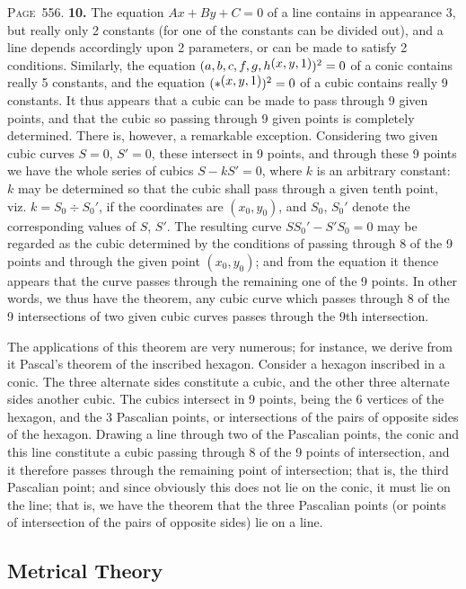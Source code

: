 \documentclass[11pt,a4paper]{article}
\theoremstyle{definition}
\begin{document}
\newpage
\noindent\textsc{Page~556.} \textbf{10.} The equation $Ax+By+C=0$ of a line contains in appearance 3, but really only 2 constants (for one of the constants can be divided out), and a line depends accordingly upon 2 parameters, or can be made to satisfy 2 conditions. Similarly, the equation $(a,b,c,f,g,h\,\raisebox{0.5ex}{\text{$\!(x,y,1)$}})^2=0$ of a conic contains really 5 constants, and the equation $(*\,\raisebox{0.5ex}{\text{$\!(x,y,1)$}})^2=0$ of a cubic contains really 9 constants. It thus appears that a cubic can be made to pass through 9 given points, and that the cubic so passing through 9 given points is completely determined. There is, however, a remarkable exception. Considering two given cubic curves $S=0$, $S'=0$, these intersect in 9 points, and through these 9 points we have the whole series of cubics $S-kS'=0$, where $k$ is an arbitrary constant: $k$ may be determined so that the cubic shall pass through a given tenth point, viz. $k=S_0\div S_0'$, if the coordinates are $(x_0,y_0)$, and $S_0$, $S_0'$ denote the corresponding values of $S$, $S'$. The resulting curve $SS_0'-S'S_0=0$ may be regarded as the cubic determined by the conditions of passing through 8 of the 9 points and through the given point $(x_0,y_0)$; and from the equation it thence appears that the curve passes through the remaining one of the 9 points. In other words, we thus have the theorem, any cubic curve which passes through 8 of the 9 intersections of two given cubic curves passes through the 9th intersection.

The applications of this theorem are very numerous; for instance, we derive from it Pascal's theorem of the inscribed hexagon. Consider a hexagon inscribed in a conic. The three alternate sides constitute a cubic, and the other three alternate sides another cubic. The cubics intersect in 9 points, being the 6 vertices of the hexagon, and the 3 Pascalian points, or intersections of the pairs of opposite sides of the hexagon. Drawing a line through two of the Pascalian points, the conic and this line constitute a cubic passing through 8 of the 9 points of intersection, and it therefore passes through the remaining point of intersection; that is, the third Pascalian point; and since obviously this does not lie on the conic, it must lie on the line; that is, we have the theorem that the three Pascalian points (or points of intersection of the pairs of opposite sides) lie on a line.

\subsection*{Metrical Theory}
\end{document}
